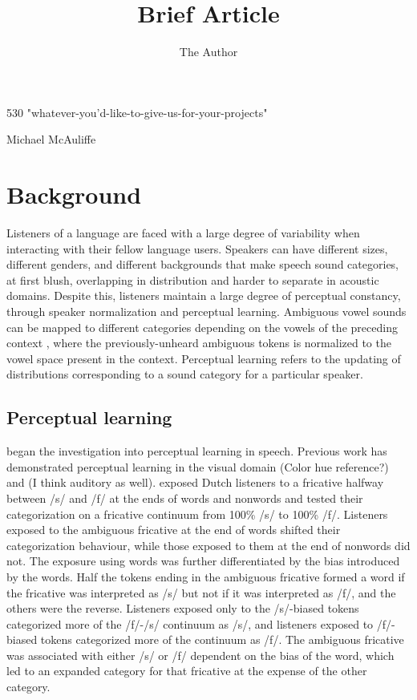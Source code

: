 \documentclass[11pt]{article} %
\title{Brief Article}
\author{The Author}
\begin{document}
\begin{center}
530 "whatever-you'd-like-to-give-us-for-your-projects"

Michael McAuliffe
\end{center}

\section{Background}

Listeners of a language are faced with a large degree of variability when interacting with their fellow language users.  
Speakers can have different sizes, different genders, and different backgrounds that make speech sound categories, at first blush, overlapping in distribution and harder to separate in acoustic domains.
Despite this, listeners maintain a large degree of perceptual constancy, through speaker normalization and perceptual learning.  
Ambiguous vowel sounds can be mapped to different categories depending on the vowels of the preceding context \citep{Ladefoged1957}, where the previously-unheard ambiguous tokens is normalized to the vowel space present in the context.  
Perceptual learning refers to the updating of distributions corresponding to a sound category for a particular speaker.

\subsection{Perceptual learning}

\citet{Norris2003} began the investigation into perceptual learning in speech. Previous work has demonstrated perceptual learning in the visual domain (Color hue reference?) and (I think auditory as well).  
\citet{Norris2003} exposed Dutch listeners to a fricative halfway between /s/ and /f/ at the ends of words and nonwords and tested their categorization on a fricative continuum from 100\% /s/ to 100\% /f/. 
 Listeners exposed to the ambiguous fricative at the end of words shifted their categorization behaviour, while those exposed to them at the end of nonwords did not.  The exposure using words was further differentiated by the bias introduced by the words.  
Half the tokens ending in the ambiguous fricative formed a word if the fricative was interpreted as /s/ but not if it was interpreted as /f/, and the others were the reverse.  
Listeners exposed only to the /s/-biased tokens categorized more of the /f/-/s/ continuum as /s/, and listeners exposed to /f/-biased tokens categorized more of the continuum as /f/.  
The ambiguous fricative was associated with either /s/ or /f/ dependent on the bias of the word, which led to an expanded category for that fricative at the expense of the other category.
\end{document}
